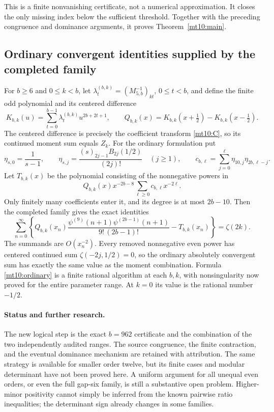 \documentclass[11pt,a4paper]{article}
\numberwithin{equation}{section}
\theoremstyle{definition}
\theoremstyle{remark}
\begin{document}
This is a finite nonvanishing certificate, not a numerical
approximation. It closes the only missing index below the sufficient
threshold. Together with the preceding congruence and dominance
arguments, it proves Theorem~\ref{mt10:main}.

\subsection{Ordinary convergent identities supplied by the completed family}

For $b\ge6$ and $0\le k<b$, let
$\lambda^{(b,k)}_t=(M_{5,b}^{-1})_{kt}$, $0\le t<b$, and define
the finite odd polynomial and its centered difference
\[
 K_{b,k}(u)=\sum_{t=0}^{b-1}\lambda^{(b,k)}_tu^{2b+2t+1},
 \qquad Q_{b,k}(x)=K_{b,k}(x+\tfrac12)-K_{b,k}(x-\tfrac12).
\]
The centered difference is precisely the coefficient transform
\eqref{mt10:C}, so its continued moment sum equals $Z_k$.
For the ordinary formulation put
\[
 \eta_{s,0}=\frac1{s-1},\qquad
 \eta_{s,j}=\frac{(s)_{2j-1}B_{2j}(1/2)}{(2j)!}\quad(j\ge1),
 \qquad c_{b,\ell}=\sum_{j=0}^{\ell}\eta_{10,j}\eta_{2b,\ell-j}.
\]
Let $T_{b,k}(x)$ be the polynomial consisting of the nonnegative
powers in
\[
             Q_{b,k}(x)x^{-2b-8}\sum_{\ell\ge0}c_{b,\ell}x^{-2\ell}.
\]
Only finitely many coefficients enter it, and its degree is at most
$2b-10$. Then the completed family gives the exact identities
\begin{equation}\label{mt10:ordinary}
 \boxed{\displaystyle
 \sum_{n=0}^{\infty}\left\{
 Q_{b,k}(x_n)
  \frac{\psi^{(9)}(n+1)\psi^{(2b-1)}(n+1)}{9!\,(2b-1)!}
       -T_{b,k}(x_n)\right\}=\zeta(2k).}
\end{equation}
The summands are $O(x_n^{-2})$. Every removed nonnegative even
power has centered continued sum $\zeta(-2j,1/2)=0$, so the
ordinary absolutely convergent sum has exactly the same value as
the moment combination. Formula \eqref{mt10:ordinary} is a finite
rational algorithm at each $b,k$, with nonsingularity now proved
for the entire parameter range. At $k=0$ its value is the rational
number $-1/2$.

\paragraph{Status and further research.}
The new logical step is the exact $b=962$ certificate and the
combination of the two independently audited ranges. The source
congruence, the finite contraction, and the eventual dominance
mechanism are retained with attribution. The same strategy is
available for smaller order twelve, but its finite cases and modular
determinant have not been proved here. A uniform argument for all
unequal even orders, or even the full gap-six family, is still a
substantive open problem. Higher-minor positivity cannot simply be
inferred from the known pairwise ratio inequalities; the determinant
sign already changes in some families.
\end{document}
